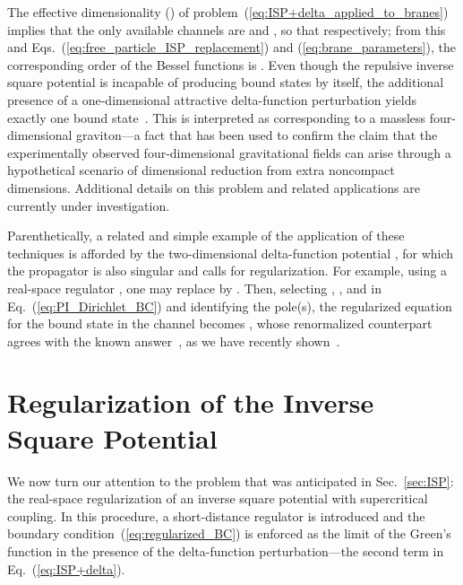 \documentclass[a4paper,preprint,draft,showpacs,amsmath,amsfonts,amssymb,aps,prd]{revtex4}%
\begin{document}
 The effective dimensionality \coordHE{}  (\coordHE{})
of problem~(\ref{eq:ISP+delta_applied_to_branes})
implies that the only available channels are \coordHE{} and \coordHE{},
so that \coordHE{} respectively;
from this
 and Eqs.~(\ref{eq:free_particle_ISP_replacement}) and (\ref{eq:brane_parameters}),
the corresponding order of the Bessel functions is 
 \coordHE{}. 
Even though
the repulsive inverse square potential is incapable
of producing bound states by itself,
the additional presence of a one-dimensional attractive delta-function perturbation
yields exactly one bound state~\cite{Randall-Sundrum}.
 This is interpreted as corresponding to a massless
four-dimensional graviton---a fact that has been used to confirm the claim that 
the experimentally observed four-dimensional gravitational fields can arise through 
a hypothetical scenario of dimensional
reduction from extra noncompact dimensions.
Additional details on this problem and related applications are currently 
under investigation.

Parenthetically, a related and simple example
of the application of these
techniques is afforded by
the two-dimensional delta-function potential 
\coordHE{}, for which the
propagator is also singular and calls for regularization. 
For example, using
a real-space regulator \coordHE{}, one may replace
   \coordHE{} by
\coordHE{}.
Then, selecting
\coordHE{}, \coordHE{}, and \coordHE{} in
Eq.~(\ref{eq:PI_Dirichlet_BC}) and identifying the pole(s), 
the regularized equation for the bound state in the \coordHE{} channel
becomes
\coordHE{},
whose renormalized counterpart agrees with the known 
answer~\cite{delta},
as we have recently shown~\cite{cam:01c}.



\section{Regularization of the Inverse Square Potential}
\label{sec:ISP_regularization}


We now turn our attention to the problem that was anticipated in Sec.~\ref{sec:ISP}:
the real-space regularization of an inverse square potential with supercritical coupling.
In this procedure, a short-distance regulator \coordHE{} is introduced and the
boundary condition~(\ref{eq:regularized_BC}) is enforced
as the
 \myHighlight{$\sigma \rightarrow \infty$}\coordHE{} limit
of the 
Green's function \coordHE{}
in the presence of the delta-function perturbation---the second term
in Eq.~(\ref{eq:ISP+delta}).
\end{document}
